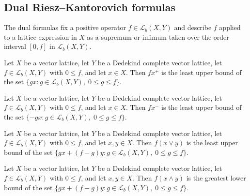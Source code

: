 \subsection{Dual Riesz--Kantorovich formulas}

The dual formulas fix a positive operator $f \in \mathcal{L}_b(X,
Y)$ and describe $f$ applied to a lattice expression in $X$ as a
supremum or infimum taken over the order interval $[0, f]$ in
$\mathcal{L}_b(X, Y)$.

\begin{theorem}
\label{thm:isLUB-apply-posPart}
\leanok
{}
Let $X$ be a vector lattice, let $Y$ be a Dedekind complete vector
lattice, let $f \in \mathcal{L}_b(X, Y)$ with $0 \le f$, and let
$x \in X$. Then $f x^{+}$ is the least upper bound of the set
$\{ g x : g \in \mathcal{L}_b(X, Y), \; 0 \le g \le f \}$.
\end{theorem}

\begin{theorem}
\label{thm:isLUB-apply-negPart}
\leanok
{}
Let $X$ be a vector lattice, let $Y$ be a Dedekind complete vector
lattice, let $f \in \mathcal{L}_b(X, Y)$ with $0 \le f$, and let
$x \in X$. Then $f x^{-}$ is the least upper bound of the set
$\{ -g x : g \in \mathcal{L}_b(X, Y), \; 0 \le g \le f \}$.
\end{theorem}

\begin{theorem}
\label{thm:isLUB-apply-sup}
\leanok
{}
Let $X$ be a vector lattice, let $Y$ be a Dedekind complete vector
lattice, let $f \in \mathcal{L}_b(X, Y)$ with $0 \le f$, and let
$x, y \in X$. Then $f (x \vee y)$ is the least upper bound of the
set $\{ g x + (f - g) y : g \in \mathcal{L}_b(X, Y), \; 0 \le g \le
f \}$.
\end{theorem}

\begin{theorem}
\label{thm:isGLB-apply-inf}
\leanok
{}
Let $X$ be a vector lattice, let $Y$ be a Dedekind complete vector
lattice, let $f \in \mathcal{L}_b(X, Y)$ with $0 \le f$, and let
$x, y \in X$. Then $f (x \wedge y)$ is the greatest lower bound of
the set $\{ g x + (f - g) y : g \in \mathcal{L}_b(X, Y), \; 0 \le
g \le f \}$.
\end{theorem}

